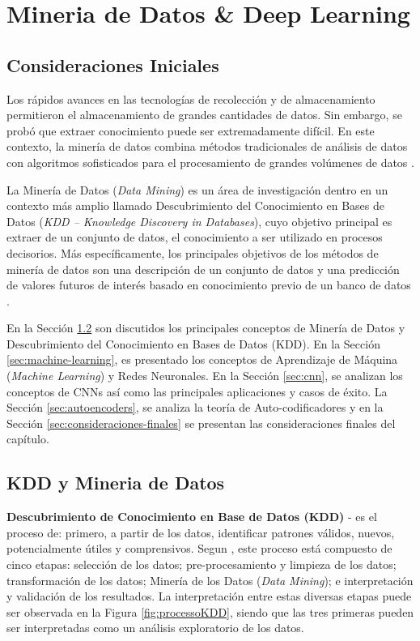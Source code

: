 \chapter{Mineria de Datos \& Deep Learning }\label{cap:deep_learning}

\section{Consideraciones Iniciales}

Los rápidos avances en las tecnologías de recolección y de almacenamiento permitieron el almacenamiento de grandes cantidades de datos. Sin embargo, se probó que extraer conocimiento puede ser extremadamente difícil. En este contexto, la minería de datos combina métodos tradicionales de análisis de datos con algoritmos sofisticados para el procesamiento de grandes volúmenes de datos \cite{Tan:2005:IDM:1095618}.

La Minería de Datos (\textit{Data Mining}) es un área de investigación dentro en un contexto más amplio llamado Descubrimiento del Conocimiento en Bases de Datos (\textit{KDD – Knowledge Discovery in Databases}), cuyo objetivo principal es extraer de un conjunto de datos, el conocimiento a ser utilizado en procesos decisorios. Más específicamente, los principales objetivos de los métodos de minería de datos son una descripción de un conjunto de datos y una predicción de valores futuros de interés basado en conocimiento previo de un banco de datos \cite{Fayyad:1996:DMK:257938.257942}.
 
 En la Sección \ref{sec:kdd-datamining} son discutidos los principales conceptos de Minería de Datos y Descubrimiento del Conocimiento en Bases de Datos (KDD). En la Sección \ref{sec:machine-learning}, es  presentado los conceptos de Aprendizaje de Máquina  (\textit{Machine Learning}) y Redes Neuronales. En la Sección \ref{sec:cnn}, se analizan los conceptos de  \acf{CNNs} así como las principales  aplicaciones y casos de éxito. La Sección \ref{sec:autoencoders}, se analiza la teoría de Auto-codificadores y en la Sección \ref{sec:consideraciones-finales} se presentan las consideraciones finales del capítulo.

\section{KDD y Mineria de Datos}\label{sec:kdd-datamining}

\textbf{Descubrimiento de Conocimiento en Base de Datos (KDD)} - es el proceso de: primero, a partir de los datos, identificar patrones válidos, nuevos, potencialmente útiles y comprensivos. Segun  \cite{Fayyad:1996:DMK:257938.257942}, este proceso está compuesto de cinco etapas: selección de los datos; pre-procesamiento y limpieza de los datos; transformación de los datos; Minería de los Datos (\textit{Data Mining}); e interpretación y validación de los resultados. La interpretación entre estas diversas etapas puede ser observada en la Figura \ref{fig:processoKDD}, siendo que las tres primeras pueden ser interpretadas como un análisis exploratorio de los datos.

